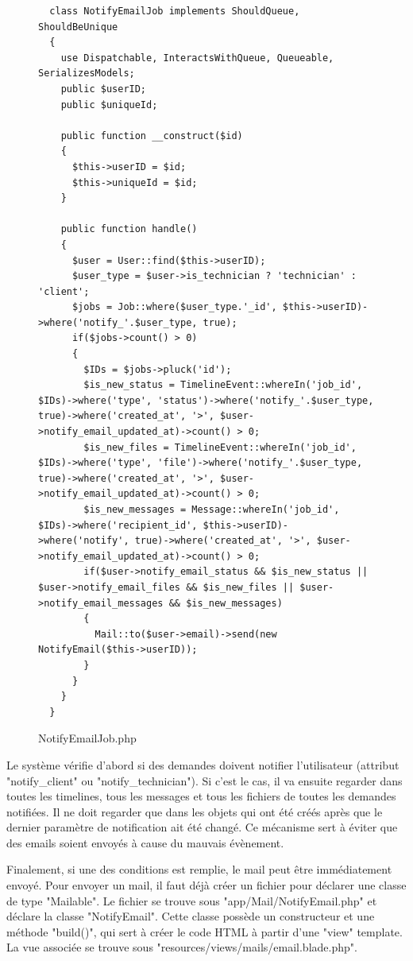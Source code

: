 \documentclass[
    iai, %
    eai, %
]{heig-tb}
\begin{document}
\begin{figure}[h]
  \begin{verbatim}
  class NotifyEmailJob implements ShouldQueue, ShouldBeUnique
  {
    use Dispatchable, InteractsWithQueue, Queueable, SerializesModels;
    public $userID;
    public $uniqueId;

    public function __construct($id)
    {
      $this->userID = $id;
      $this->uniqueId = $id;
    }

    public function handle()
    {
      $user = User::find($this->userID);
      $user_type = $user->is_technician ? 'technician' : 'client';
      $jobs = Job::where($user_type.'_id', $this->userID)->where('notify_'.$user_type, true);
      if($jobs->count() > 0)
      {
        $IDs = $jobs->pluck('id');
        $is_new_status = TimelineEvent::whereIn('job_id', $IDs)->where('type', 'status')->where('notify_'.$user_type, true)->where('created_at', '>', $user->notify_email_updated_at)->count() > 0;
        $is_new_files = TimelineEvent::whereIn('job_id', $IDs)->where('type', 'file')->where('notify_'.$user_type, true)->where('created_at', '>', $user->notify_email_updated_at)->count() > 0;
        $is_new_messages = Message::whereIn('job_id', $IDs)->where('recipient_id', $this->userID)->where('notify', true)->where('created_at', '>', $user->notify_email_updated_at)->count() > 0;
        if($user->notify_email_status && $is_new_status || $user->notify_email_files && $is_new_files || $user->notify_email_messages && $is_new_messages)
        {
          Mail::to($user->email)->send(new NotifyEmail($this->userID));
        }
      }
    }
  }
  \end{verbatim}
  \caption{NotifyEmailJob.php}
\end{figure}

Le système vérifie d'abord si des demandes doivent notifier l'utilisateur (attribut "notify\_client" ou "notify\_technician"). Si c'est le cas, il va ensuite regarder dans toutes les timelines, tous les messages et tous les fichiers de toutes les demandes notifiées. Il ne doit regarder que dans les objets qui ont été créés après que le dernier paramètre de notification ait été changé.
Ce mécanisme sert à éviter que des emails soient envoyés à cause du mauvais évènement.

\newpage
Finalement, si une des conditions est remplie, le mail peut être immédiatement envoyé. Pour envoyer un mail, il faut déjà créer un fichier pour déclarer une classe de type "Mailable". Le fichier se trouve sous "app/Mail/NotifyEmail.php" et déclare la classe "NotifyEmail". Cette classe possède un constructeur et une méthode "build()", qui sert à créer le code HTML à partir d'une "view" template. La vue associée se trouve sous "resources/views/mails/email.blade.php".
\end{document}

